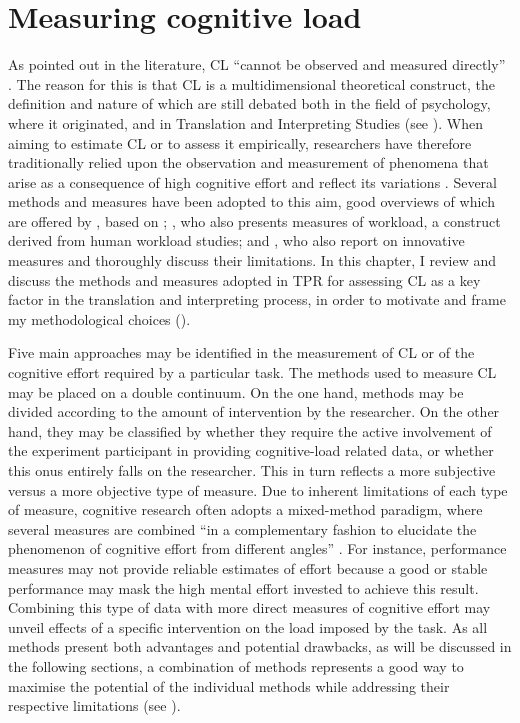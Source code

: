 \chapter{Measuring cognitive load} \label{chapter4}





As pointed out in the literature, CL ``cannot be observed and measured directly'' \citep[648]{chen_construct_2017}. The reason for this is that CL is a multidimensional theoretical construct, the definition and nature of which are still debated both in the field of psychology, where it originated, and in Translation and Interpreting Studies (see ). When aiming to estimate CL or to assess it empirically, researchers have therefore traditionally relied upon the observation and measurement of phenomena that arise as a consequence of high cognitive effort and reflect its variations \citep{paas_cognitive_2003, ehrensberger-dow_cognitive_2020}. Several methods and measures have been adopted to this aim, good overviews of which are offered by \citet{seeber_cognitive_2013}, based on \citet{paas_cognitive_2003}; \citet{chen_construct_2017}, who also presents measures of workload, a construct derived from human workload studies; and \citet{ehrensberger-dow_cognitive_2020}, who also report on innovative measures and thoroughly discuss their limitations. In this chapter, I review and discuss the methods and measures adopted in TPR for assessing CL as a key factor in the translation and interpreting process, in order to motivate and frame my methodological choices ().

Five main approaches may be identified in the measurement of CL or of the cognitive effort required by a particular task. The methods used to measure CL may be placed on a double continuum. On the one hand, methods may be divided according to the amount of intervention by the researcher. On the other hand, they may be classified by whether they require the active involvement of the experiment participant in providing cognitive-load related data, or whether this onus entirely falls on the researcher. This in turn reflects a more subjective versus a more objective type of measure. Due to inherent limitations of each type of measure, cognitive research often adopts a mixed-method paradigm, where several measures are combined ``in a complementary fashion to elucidate the phenomenon of cognitive effort from different angles'' \citep[222]{ehrensberger-dow_cognitive_2020}. For instance, performance measures may not provide reliable estimates of effort because a good or stable performance may mask the high mental effort invested to achieve this result. Combining this type of data with more direct measures of cognitive effort may unveil effects of a specific intervention on the load imposed by the task. As all methods present both advantages and potential drawbacks, as will be discussed in the following sections, a combination of methods represents a good way to maximise the potential of the individual methods while addressing their respective limitations (see ).

